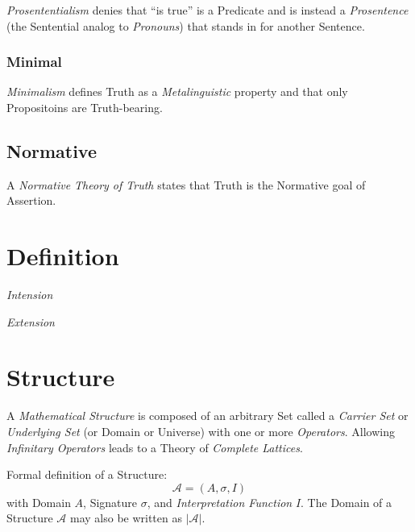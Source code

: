\emph{Prosententialism} denies that ``is true'' is a Predicate and is
instead a \emph{Prosentence} (the Sentential analog to
\emph{Pronouns}) that stands in for another Sentence.

\subsubsection{Minimal}

\emph{Minimalism} defines Truth as a \emph{Metalinguistic} property
and that only Propositoins are Truth-bearing.

\subsection{Normative}

A \emph{Normative Theory of Truth} states that Truth is the Normative
goal of Assertion.



\section{Definition}\label{sec:semantic_definition}

\emph{Intension}

\emph{Extension}



\section{Structure}\label{sec:mathematical_structure}

A \emph{Mathematical Structure} is composed of an arbitrary Set called
a \emph{Carrier Set} or \emph{Underlying Set} (or Domain or Universe)
with one or more \emph{Operators}. Allowing \emph{Infinitary
  Operators} leads to a Theory of \emph{Complete Lattices}.

Formal definition of a Structure:
\[
    \mathcal{A} = (A, \sigma, I)
\]
with Domain $A$, Signature $\sigma$, and \emph{Interpretation
  Function} $I$. The Domain of a Structure $\mathcal{A}$ may also be
written as $|\mathcal{A}|$.

